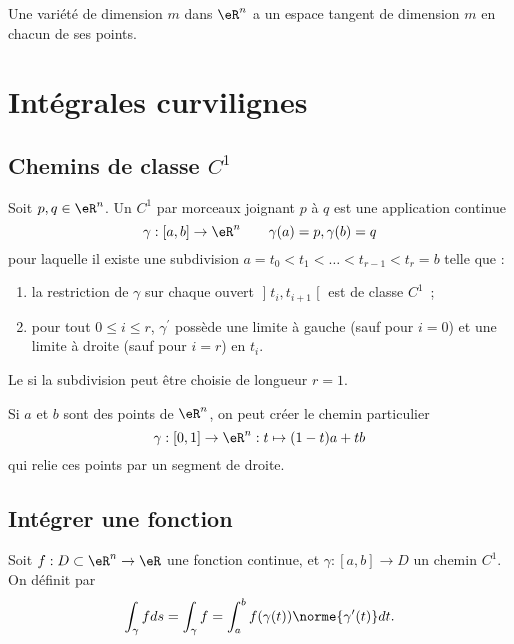 \begin{proposition}			\label{PropDimEspTanVarConst}
	Une variété de dimension $m$ dans $\eR^n$ a un espace tangent de dimension $m$ en chacun de ses points.
\end{proposition}

\section{Intégrales curvilignes}
\label{secintcurvi}

\subsection{Chemins de classe \texorpdfstring{$C^1$}{C1}}

Soit $p, q\in \eR^n$. Un  $C^1$ par morceaux joignant $p$ à $q$ est une application continue
\begin{equation}
  \gamma : [a,b] \to \eR^n \qquad \gamma(a) = p, \gamma(b) = q
\end{equation}
pour laquelle il existe une subdivision $a = t_0 < t_1 < \ldots < t_{r-1} < t_r = b$ telle que :
\begin{enumerate}
\item la restriction de $\gamma$ sur chaque ouvert $\mathopen]t_i,
  t_{i+1}\mathclose[$ est de classe $C^1$~;
\item pour tout $0 \leq i \leq r$, $\gamma^\prime$ possède une limite
  à gauche (sauf pour $i = 0$) et une limite à droite (sauf pour $i =
  r$) en $t_i$.
\end{enumerate}
Le  si la
subdivision peut être choisie de \og longueur\fg{} $r = 1$.

\begin{remark}
	Si $a$ et $b$ sont des points de
  $\eR^n$, on peut créer le chemin particulier
  \begin{equation*}
    \gamma : [0,1] \to \eR^n : t \mapsto (1-t)a + tb
  \end{equation*}
  qui relie ces points par un segment de droite.
\end{remark}

\subsection{Intégrer une fonction}
Soit $f : D \subset \eR^n \to \eR$ une fonction continue, et $\gamma
: [a,b] \to D$ un chemin $C^1$. On définit  par
\begin{equation*}
  \int_\gamma f d s = \int_\gamma f = \int_a^b f(\gamma(t)) \norme{\gamma^\prime(t)} d t.
\end{equation*}

